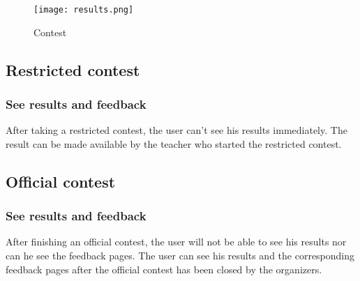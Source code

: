 		\begin{figure}[h]
		  \centering
			\texttt{[image: results.png]}
		  \caption{Contest}
		  \label{Contest}
		\end{figure}

\subsection*{Restricted contest}

\subsubsection*{See results and feedback}
After taking a restricted contest, the user can't see his results immediately. The result can be made available by the teacher who started the restricted contest. 

\subsection*{Official contest}

\subsubsection*{See results and feedback}
After finishing an official contest, the user will not be able to see his results nor can he see the feedback pages. The user can see his results and the corresponding feedback pages after the official contest has been closed by the organizers. 

